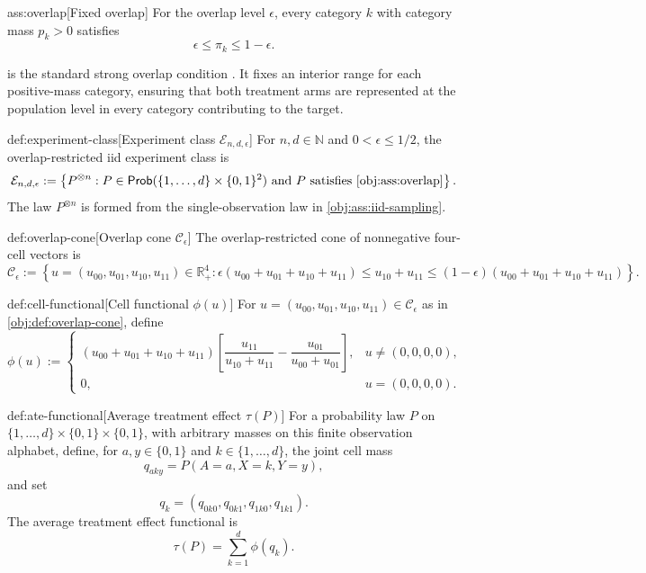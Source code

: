 \documentclass[11pt]{article}
\begin{document}
\begin{assumptionv}{ass:overlap}[Fixed overlap]
For the overlap level \(\epsilon\), every category \(k\) with category mass \(p_k>0\) satisfies
\[
\epsilon \le \pi_k \le 1-\epsilon .
\]
\end{assumptionv}

 is the standard strong overlap condition \citep{ZengBalakrishnanHanKennedy2024}. It fixes an interior range for each positive-mass category, ensuring that both treatment arms are represented at the population level in every category contributing to the target.

\begin{definitionv}{def:experiment-class}[Experiment class \(\mathcal E_{n,d,\epsilon}\)]
For \(n,d\in\mathbb N\) and \(0<\epsilon\le 1/2\), the overlap-restricted iid experiment class is
\[
\mathcal E_{n,d,\epsilon}
:=
\left\{
P^{\otimes n}:
P\in\mathsf{Prob}(\{1,\ldots,d\}\times\{0,1\}^2)
\ \text{and } P \text{ satisfies } \cref{obj:ass:overlap}
\right\}.
\]
The law \(P^{\otimes n}\) is formed from the single-observation law in \cref{obj:ass:iid-sampling}.
\end{definitionv}

\begin{definitionv}{def:overlap-cone}[Overlap cone \(\mathcal C_\epsilon\)]
The overlap-restricted cone of nonnegative four-cell vectors is
\[
\mathcal C_\epsilon
:=
\left\{
u=(u_{00},u_{01},u_{10},u_{11})\in\mathbb R_+^4:
\epsilon(u_{00}+u_{01}+u_{10}+u_{11})
\le
u_{10}+u_{11}
\le
(1-\epsilon)(u_{00}+u_{01}+u_{10}+u_{11})
\right\}.
\]
\end{definitionv}

\begin{definitionv}{def:cell-functional}[Cell functional \(\phi(u)\)]
For \(u=(u_{00},u_{01},u_{10},u_{11})\in\mathcal C_\epsilon\) as in \cref{obj:def:overlap-cone}, define
\[
\phi(u)
:=
\begin{cases}
(u_{00}+u_{01}+u_{10}+u_{11})
\left[
\dfrac{u_{11}}{u_{10}+u_{11}}
-
\dfrac{u_{01}}{u_{00}+u_{01}}
\right],
& u\neq(0,0,0,0),\\[1.2em]
0,
& u=(0,0,0,0).
\end{cases}
\]
\end{definitionv}

\begin{definitionv}{def:ate-functional}[Average treatment effect \(\tau(P)\)]
For a probability law \(P\) on \(\{1,\ldots,d\}\times\{0,1\}\times\{0,1\}\), with arbitrary masses on this finite observation alphabet, define, for \(a,y\in\{0,1\}\) and \(k\in\{1,\ldots,d\}\), the joint cell mass
\[
q_{aky}=P(A=a,X=k,Y=y),
\]
and set
\[
q_k=(q_{0k0},q_{0k1},q_{1k0},q_{1k1}).
\]
The average treatment effect functional is
\[
\tau(P)
=
\sum_{k=1}^{d}\phi(q_k).
\]
\end{definitionv}
\end{document}
